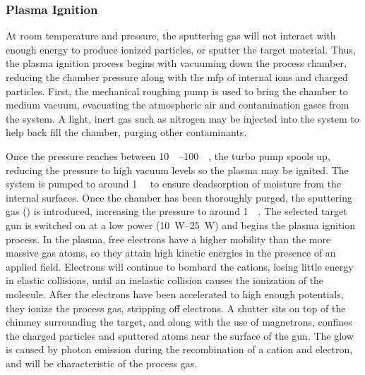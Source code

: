 \documentclass[../../../main.tex]{subfiles}
\begin{document}
%
    \subsubsection{Plasma Ignition}%
    \label{app:thin-film-processing:plasma-sputtering:plasma-ignition}%
    At room temperature and pressure, the sputtering gas will not interact with enough energy to produce ionized particles, or sputter the target material.
    Thus, the plasma ignition process begins with vacuuming down the process chamber, reducing the chamber pressure along with the \gls{mfp} of internal ions and charged particles.
    First, the mechanical roughing pump is used to bring the chamber to medium vacuum, evacuating the atmospheric air and contamination gases from the system.
    A light, inert gas such as nitrogen may be injected into the system to help back fill the chamber, purging other contaminants.
    \par%
    Once the pressure reaches between \SIrange{10}{100}{\milli\torr}, the turbo pump spools up, reducing the pressure to high vacuum levels so the plasma may be ignited.
    The system is pumped to around \SI{1}{\micro\torr} to ensure deadsorption of moisture from the internal surfaces.
    Once the chamber has been thoroughly purged, the sputtering gas () is introduced, increasing the pressure to around \SI{1}{\milli\torr}.
    The selected target gun is switched on at a low power (\SIrange{10}{25}{\watt}) and begins the plasma ignition process.
    In the plasma, free electrons have a higher mobility than the more massive gas atoms, so they attain high kinetic energies in the presence of an applied field.
    Electrons will continue to bombard the cations, losing little energy in elastic collisions, until an inelastic collision causes the ionization of the molecule.
    After the electrons have been accelerated to high enough potentials, they ionize the process gas, stripping off electrons.
    A shutter sits on top of the chimney surrounding the target, and along with the use of magnetrons, confines the charged particles and sputtered atoms near the surface of the gun.
    The glow is caused by photon emission during the recombination of a cation and electron, and will be characteristic of the process gas.
\end{document}
